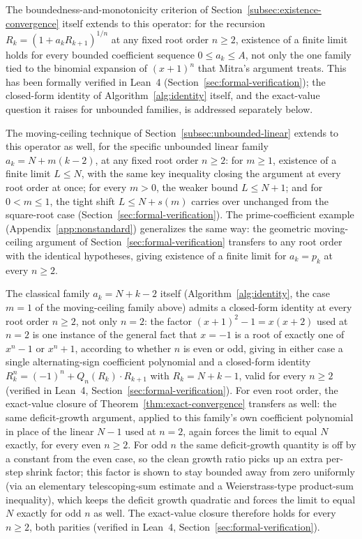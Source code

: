 \documentclass[11pt,a4paper]{amsart}
\theoremstyle{plain}
\theoremstyle{definition}
\theoremstyle{remark}
\begin{document}
The boundedness-and-monotonicity criterion of Section~\ref{subsec:existence-convergence} itself extends to this operator: for the recursion $R_k = (1+a_k R_{k+1})^{1/n}$ at any fixed root order $n \ge 2$, existence of a finite limit holds for every bounded coefficient sequence $0 \le a_k \le A$, not only the one family tied to the binomial expansion of $(x+1)^n$ that Mitra's argument treats. This has been formally verified in Lean~4 (Section~\ref{sec:formal-verification}); the closed-form identity of Algorithm~\ref{alg:identity} itself, and the exact-value question it raises for unbounded families, is addressed separately below.

The moving-ceiling technique of Section~\ref{subsec:unbounded-linear} extends to this operator as well, for the specific unbounded linear family $a_k=N+m(k-2)$, at any fixed root order $n \ge 2$: for $m \ge 1$, existence of a finite limit $L \le N$, with the same key inequality closing the argument at every root order at once; for every $m>0$, the weaker bound $L\le N+1$; and for $0<m\le 1$, the tight shift $L\le N+s(m)$ carries over unchanged from the square-root case (Section~\ref{sec:formal-verification}). The prime-coefficient example (Appendix~\ref{app:nonstandard}) generalizes the same way: the geometric moving-ceiling argument of Section~\ref{sec:formal-verification} transfers to any root order with the identical hypotheses, giving existence of a finite limit for $a_k=p_k$ at every $n\ge 2$.

The classical family $a_k=N+k-2$ itself (Algorithm~\ref{alg:identity}, the case $m=1$ of the moving-ceiling family above) admits a closed-form identity at every root order $n\ge 2$, not only $n=2$: the factor $(x+1)^2-1=x(x+2)$ used at $n=2$ is one instance of the general fact that $x=-1$ is a root of exactly one of $x^n-1$ or $x^n+1$, according to whether $n$ is even or odd, giving in either case a single alternating-sign coefficient polynomial and a closed-form identity $R_k^n=(-1)^n+Q_n(R_k)\cdot R_{k+1}$ with $R_k=N+k-1$, valid for every $n\ge 2$ (verified in Lean~4, Section~\ref{sec:formal-verification}). For even root order, the exact-value closure of Theorem~\ref{thm:exact-convergence} transfers as well: the same deficit-growth argument, applied to this family's own coefficient polynomial in place of the linear $N-1$ used at $n=2$, again forces the limit to equal $N$ exactly, for every even $n\ge 2$. For odd $n$ the same deficit-growth quantity is off by a constant from the even case, so the clean growth ratio picks up an extra per-step shrink factor; this factor is shown to stay bounded away from zero uniformly (via an elementary telescoping-sum estimate and a Weierstrass-type product-sum inequality), which keeps the deficit growth quadratic and forces the limit to equal $N$ exactly for odd $n$ as well. The exact-value closure therefore holds for every $n\ge 2$, both parities (verified in Lean~4, Section~\ref{sec:formal-verification}).
\end{document}
